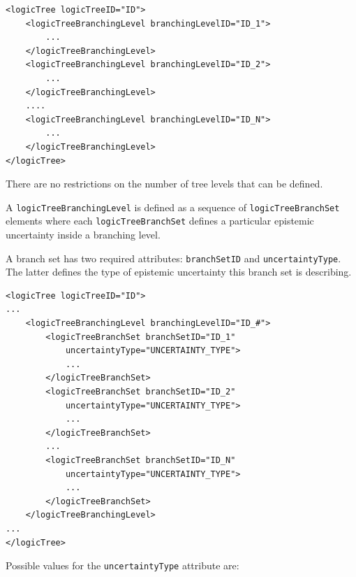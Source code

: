 \begin{verbatim}
<logicTree logicTreeID="ID">
	<logicTreeBranchingLevel branchingLevelID="ID_1">
		...
	</logicTreeBranchingLevel>
	<logicTreeBranchingLevel branchingLevelID="ID_2">
		...
	</logicTreeBranchingLevel>
	....
	<logicTreeBranchingLevel branchingLevelID="ID_N">
		...
	</logicTreeBranchingLevel>
</logicTree>
\end{verbatim}

There are no restrictions on the number of tree levels that can be defined.

A \Verb+logicTreeBranchingLevel+ is defined as a sequence of
\Verb+logicTreeBranchSet+ elements where each \Verb+logicTreeBranchSet+
defines a particular epistemic uncertainty inside a branching level.

A branch set has two required attributes: \Verb+branchSetID+ and
\Verb+uncertaintyType+. The latter defines the type of epistemic uncertainty this branch set is describing.

\begin{verbatim}
<logicTree logicTreeID="ID">
...
	<logicTreeBranchingLevel branchingLevelID="ID_#">
		<logicTreeBranchSet branchSetID="ID_1"
			uncertaintyType="UNCERTAINTY_TYPE">
			...
		</logicTreeBranchSet>
		<logicTreeBranchSet branchSetID="ID_2"
			uncertaintyType="UNCERTAINTY_TYPE">
			...
		</logicTreeBranchSet>
		...
		<logicTreeBranchSet branchSetID="ID_N"
			uncertaintyType="UNCERTAINTY_TYPE">
			...
		</logicTreeBranchSet>
	</logicTreeBranchingLevel>
...
</logicTree>
\end{verbatim}

Possible values for the \Verb+uncertaintyType+ attribute are:

